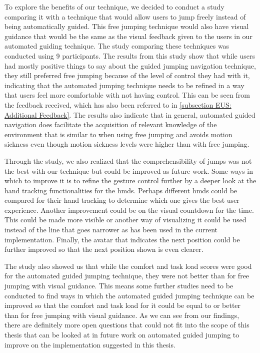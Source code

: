 To explore the benefits of our technique, we decided to conduct a study comparing it with a technique that would allow users to jump freely instead of being automatically guided. This free jumping technique would also have visual guidance that would be the same as the visual feedback given to the users in our automated guiding technique. The study comparing these techniques was conducted using 9 participants. The results from this study show that while users had mostly positive things to say about the guided jumping navigation technique, they still preferred free jumping because of the level of control they had with it, indicating that the automated jumping technique needs to be refined in a way that users feel more comfortable with not having control. This can be seen from the feedback received, which has also been referred to in \cref{subsection EUS: Additional Feedback}. The results also indicate that in general, automated guided navigation does facilitate the acquisition of relevant knowledge of the environment that is similar to when using free jumping and avoids motion sickness even though motion sickness levels were higher than with free jumping. 

Through the study, we also realized that the comprehensibility of jumps was not the best with our technique but could be improved as future work. Some ways in which to improve it is to refine the gesture control further by a deeper look at the hand tracking functionalities for the \acrshort{hmd}s. Perhaps different \acrshort{hmd}s could be compared for their hand tracking to determine which one gives the best user experience. Another improvement could be on the visual countdown for the time. This could be made more visible or another way of visualizing it could be used instead of the line that goes narrower as has been used in the current implementation. Finally, the avatar that indicates the next position could be further improved so that the next position shown is even clearer. 

The study also showed us that while the comfort and task load scores were good for the automated guided jumping technique, they were not better than for free jumping with visual guidance. This means some further studies need to be conducted to find ways in which the automated guided jumping technique can be improved so that the comfort and task load for it could be equal to or better than for free jumping with visual guidance.  As we can see from our findings, there are definitely more open questions that could not fit into the scope of this thesis that can be looked at in future work on automated guided jumping to improve on the implementation suggested in this thesis.

